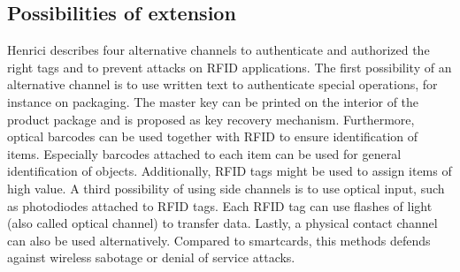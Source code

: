 \subsection{Possibilities of extension}

Henrici \cite[p.121 ff.]{henrici} describes four alternative channels to authenticate and authorized the right tags and to prevent attacks on RFID applications. 
The first possibility of an alternative channel is to use written text to authenticate special operations, for instance on packaging. The master key can be printed on the interior of the product package and is proposed as key recovery mechanism.
Furthermore, optical barcodes can be used together with RFID to ensure identification of items. Especially barcodes attached to each item can be used for general identification of objects. Additionally, RFID tags might be used to assign items of high value.
A third possibility of using side channels is to use optical input, such as photodiodes attached to RFID tags. Each RFID tag can use flashes of light (also called optical channel) to transfer data.   
Lastly, a physical contact channel can also be used alternatively. Compared to smartcards, this methods defends against wireless sabotage or denial of service attacks.


















 
